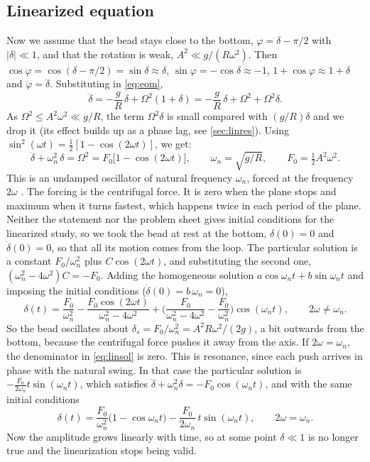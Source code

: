 \documentclass[11pt,a4paper]{article}
\newcommand{\dt}[1]{\dot{#1}}
\newcommand{\ddt}[1]{\ddot{#1}}
\begin{document}
\subsection{Linearized equation }\label{sec:lin}
Now we assume that the bead stays close to the bottom, $\varphi=\delta-\pi/2$ with $|\delta|\ll1$, and that the rotation is weak, $A^2\ll g/(R\omega^2)$. Then $\cos\varphi=\cos(\delta-\pi/2)=\sin\delta\approx\delta$, $\sin\varphi=-\cos\delta\approx-1$, $1+\cos\varphi\approx1+\delta$ and $\ddt\varphi=\ddt\delta$. Substituting in \cref{eq:eom},
\begin{equation}
\ddt\delta=-\frac gR\,\delta+\Omega^2(1+\delta)=-\frac gR\,\delta+\Omega^2+\Omega^2\delta .
\end{equation}
As $\Omega^2\le A^2\omega^2\ll g/R$, the term $\Omega^2\delta$ is small compared with $(g/R)\delta$ and we drop it (its effect builds up as a phase lag, see \cref{sec:linres}). Using $\sin^2(\omega t)=\tfrac12[1-\cos(2\omega t)]$, we get:
\begin{equation}
\ddt\delta+\omega_n^2\,\delta=\Omega^2=F_0\big[1-\cos(2\omega t)\big],\qquad \omega_n=\sqrt{g/R},\qquad F_0=\tfrac12A^2\omega^2 .
\label{eq:lin}
\end{equation}
This is an undamped oscillator of natural frequency $\omega_n$, forced at the frequency $2\omega$ \cite{notes}. The forcing is the centrifugal force. It is zero when the plane stops and maximum when it turns fastest, which happens twice in each period of the plane. Neither the statement nor the problem sheet \cite{problems} gives initial conditions for the linearized study, so we took the bead at rest at the bottom, $\delta(0)=0$ and $\dt\delta(0)=0$, so that all its motion comes from the loop. The particular solution is a constant $F_0/\omega_n^2$ plus $C\cos(2\omega t)$, and substituting the second one, $(\omega_n^2-4\omega^2)C=-F_0$. Adding the homogeneous solution $a\cos\omega_nt+b\sin\omega_nt$ and imposing the initial conditions ($\dt\delta(0)=b\,\omega_n=0$),
\begin{equation}
\delta(t)=\frac{F_0}{\omega_n^2}-\frac{F_0\cos(2\omega t)}{\omega_n^2-4\omega^2}+\Big(\frac{F_0}{\omega_n^2-4\omega^2}-\frac{F_0}{\omega_n^2}\Big)\cos(\omega_nt),\qquad 2\omega\neq\omega_n .
\label{eq:linsol}
\end{equation}
So the bead oscillates about $\delta_s=F_0/\omega_n^2=A^2R\omega^2/(2g)$, a bit outwards from the bottom, because the centrifugal force pushes it away from the axis. If $2\omega=\omega_n$, the denominator in \cref{eq:linsol} is zero. This is resonance, since each push arrives in phase with the natural swing. In that case the particular solution is $-\frac{F_0}{2\omega_n}t\sin(\omega_nt)$, which satisfies $\ddt\delta+\omega_n^2\delta=-F_0\cos(\omega_nt)$, and with the same initial conditions
\begin{equation}
\delta(t)=\frac{F_0}{\omega_n^2}\big(1-\cos\omega_nt\big)-\frac{F_0}{2\omega_n}\,t\sin(\omega_nt),\qquad 2\omega=\omega_n .
\label{eq:res}
\end{equation}
Now the amplitude grows linearly with time, so at some point $\delta\ll1$ is no longer true and the linearization stops being valid.
\end{document}
